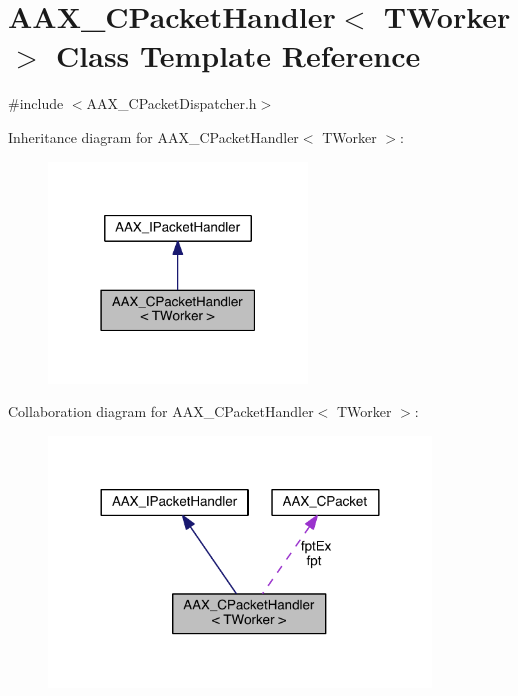 \hypertarget{a00032}{}\section{A\+A\+X\+\_\+\+C\+Packet\+Handler$<$ T\+Worker $>$ Class Template Reference}
\label{a00032}


{\ttfamily \#include $<$A\+A\+X\+\_\+\+C\+Packet\+Dispatcher.\+h$>$}



Inheritance diagram for A\+A\+X\+\_\+\+C\+Packet\+Handler$<$ T\+Worker $>$\+:
\nopagebreak
\begin{figure}[H]
\begin{center}
\leavevmode
\includegraphics[width=195pt]{a00444}
\end{center}
\end{figure}


Collaboration diagram for A\+A\+X\+\_\+\+C\+Packet\+Handler$<$ T\+Worker $>$\+:
\nopagebreak
\begin{figure}[H]
\begin{center}
\leavevmode
\includegraphics[width=288pt]{a00445}
\end{center}
\end{figure}


